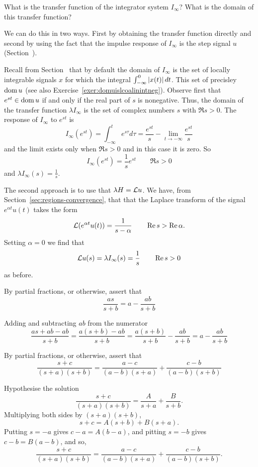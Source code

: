 \begin{excersizelist}
\item What is the transfer function of the integrator system $I_\infty$?  What is the domain of this transfer function? 
\begin{solution}
We can do this in two ways.  First by obtaining the transfer function directly and second by using the fact that the impulse response of $I_\infty$ is the step signal $u$ (Section~).

Recall from Section~ that by default the domain of $I_\infty$ is the set of locally integrable signals $x$ for which the integral $\int_{-\infty}^0 \left\vert x(t) \right\vert dt$.  This set of precisley $\operatorname{dom} u$ (see also Exercise~\ref{exer:domuislcoalinintneg}).  Observe first that $e^{st} \in \operatorname{dom} u$ if and only if the real part of $s$ is nonegative.  Thus, the domain of the transfer function $\lambda I_{\infty}$ is the set of complex numbers $s$ with $\Re s > 0$.  The response of $I_\infty$ to $e^{st}$ is
\[
I_\infty(e^{st}) = \int_{-\infty}^t e^{s\tau} d\tau = \frac{e^{st}}{s} - \lim_{t\to -\infty}\frac{e^{st}}{s}
\]
and the limit exists only when $\Re{s} > 0$ and in this case it is zero.  So
\[
I_\infty(e^{st}) = \frac{1}{s} e^{st} \qquad \Re{s} > 0
\]
and $\lambda I_\infty(s) = \tfrac{1}{s}$.

The second approach is to use that $\lambda H = \mathcal L u$.  We have, from Section~\ref{sec:regions-convergence}, that that the Laplace transform of the signal $e^{\alpha t} u(t)$ takes the form
\[
\mathcal L(e^{ \alpha t}u(t)) = \frac{1}{s-\alpha} \qquad \operatorname{Re} s > \operatorname{Re} \alpha.
\]
Setting $\alpha = 0$ we find that
\[
\mathcal L u(s) = \lambda I_\infty(s) = \frac{1}{s} \qquad \operatorname{Re} s > 0
\]
as before.
\end{solution}


\item \label{exer:partialfracfirstorder} By partial fractions, or otherwise, assert that
\[
\frac{as}{s+b} = a - \frac{ab}{s+b}
\]
\begin{solution}
Adding and subtracting $ab$ from the numerator
\[
\frac{as+ab-ab}{s+b} = \frac{a(s+b)-ab}{s+b} = \frac{a(s+b)}{s+b} - \frac{ab}{s+b} = a - \frac{ab}{s+b}
\]
\end{solution}

\item \label{exer:partialfracsecondorder} By partial fractions, or otherwise, assert that
\[
\frac{s + c}{(s+a)(s+b)} = \frac{a-c}{(a-b)(s+a)} + \frac{c-b}{(a-b)(s+b)}
\]
\begin{solution}
Hypothesise the solution
\[
\frac{s + c}{(s+a)(s+b)} = \frac{A}{s+a} + \frac{B}{s+b}.
\]
Multiplying both sides by $(s+a)(s+b)$,
\[
s+c = A(s+b) + B(s+a).
\]
Putting $s = -a$ gives $c-a = A(b-a)$, and pitting $s=-b$ gives $c-b = B(a-b)$, and so,
\[
\frac{s+c}{(s+a)(s+b)} = \frac{a-c}{(a-b)(s+a)} + \frac{c-b}{(a-b)(s+b)}.
\]
\end{solution}


\end{excersizelist}
